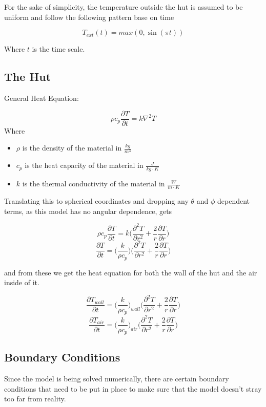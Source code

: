 \documentclass{article}
\begin{document}
For the sake of simplicity, the temperature outside the hut is assumed to be uniform and follow the following pattern base on time

\[T_{ext}(t) = max(0,\sin(\pi t))\]

Where $t$ is the time scale. 

\subsection{The Hut}
General Heat Equation:

\[\rho c_p \frac{\partial T}{\partial t} = k \nabla^2 T\]
Where 
\begin{itemize}
    \item $\rho$ is the density of the material in $\frac{kg}{m^3}$
    \item $c_p$ is the heat capacity of the material in $\frac{J}{kg \cdot K}$
    \item $k$ is the thermal conductivity of the material in $\frac{W}{m\cdot K}$
\end{itemize}

Translating this to spherical coordinates and dropping any $\theta$ and $\phi$ dependent terms, as this model has no angular dependence, gets

\[\rho c_p \frac{\partial T}{\partial t} = k \bigg(\frac{\partial^2 T}{\partial r^2} + \frac{2}{r} \frac{\partial T}{\partial r}\bigg)\]
\[\frac{\partial T}{\partial t} = \bigg(\frac{k}{\rho c_p}\bigg) \bigg(\frac{\partial^2 T}{\partial r^2} + \frac{2}{r} \frac{\partial T}{\partial r}\bigg)\]

and from these we get the heat equation for both the wall of the hut and the air inside of it.

\[\frac{\partial T_{wall}}{\partial t} = \bigg(\frac{k}{\rho c_p}\bigg)_{wall} \bigg(\frac{\partial^2 T}{\partial r^2} + \frac{2}{r} \frac{\partial T}{\partial r}\bigg)\]
\[\frac{\partial T_{air}}{\partial t} = \bigg(\frac{k}{\rho c_p}\bigg)_{air} \bigg(\frac{\partial^2 T}{\partial r^2} + \frac{2}{r} \frac{\partial T}{\partial r}\bigg)\]

\subsection{Boundary Conditions}

Since the model is being solved numerically, there are certain boundary conditions that need to be put in place to make sure that the model doesn't stray too far from reality. \\ \\
\end{document}
